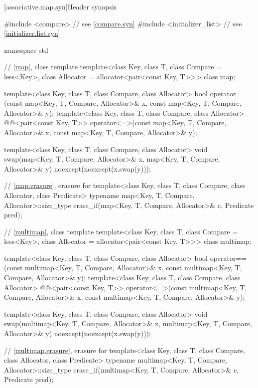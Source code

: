 [associative.map.syn]{Header  synopsis}

%
\begin{codeblock}
#include <compare>              // see \ref{compare.syn}
#include <initializer_list>     // see \ref{initializer.list.syn}

namespace std {
  // \ref{map}, class template 
  template<class Key, class T, class Compare = less<Key>,
           class Allocator = allocator<pair<const Key, T>>>
    class map;

  template<class Key, class T, class Compare, class Allocator>
    bool operator==(const map<Key, T, Compare, Allocator>& x,
                    const map<Key, T, Compare, Allocator>& y);
  template<class Key, class T, class Compare, class Allocator>
    @@<pair<const Key, T>>
      operator<=>(const map<Key, T, Compare, Allocator>& x,
                  const map<Key, T, Compare, Allocator>& y);

  template<class Key, class T, class Compare, class Allocator>
    void swap(map<Key, T, Compare, Allocator>& x,
              map<Key, T, Compare, Allocator>& y)
      noexcept(noexcept(x.swap(y)));

  // \ref{map.erasure}, erasure for 
  template<class Key, class T, class Compare, class Allocator, class Predicate>
    typename map<Key, T, Compare, Allocator>::size_type
      erase_if(map<Key, T, Compare, Allocator>& c, Predicate pred);

  // \ref{multimap}, class template 
  template<class Key, class T, class Compare = less<Key>,
           class Allocator = allocator<pair<const Key, T>>>
    class multimap;

  template<class Key, class T, class Compare, class Allocator>
    bool operator==(const multimap<Key, T, Compare, Allocator>& x,
                    const multimap<Key, T, Compare, Allocator>& y);
  template<class Key, class T, class Compare, class Allocator>
    @@<pair<const Key, T>>
      operator<=>(const multimap<Key, T, Compare, Allocator>& x,
                  const multimap<Key, T, Compare, Allocator>& y);

  template<class Key, class T, class Compare, class Allocator>
    void swap(multimap<Key, T, Compare, Allocator>& x,
              multimap<Key, T, Compare, Allocator>& y)
      noexcept(noexcept(x.swap(y)));

  // \ref{multimap.erasure}, erasure for 
  template<class Key, class T, class Compare, class Allocator, class Predicate>
    typename multimap<Key, T, Compare, Allocator>::size_type
      erase_if(multimap<Key, T, Compare, Allocator>& c, Predicate pred);

}
\end{codeblock}

